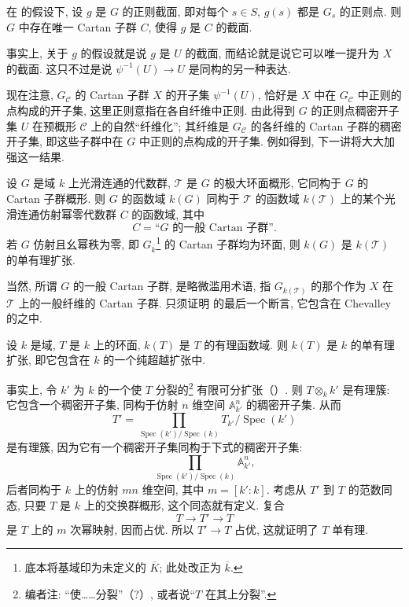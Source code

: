 \begin{corollary}
在  的假设下, 设 \(g\) 是 \(G\) 的正则截面, 即对每个 \(s\in S\), \(g(s)\) 都是 \(G_s\) 的正则点. 则 \(G\) 中存在唯一 Cartan 子群 \(C\), 使得 \(g\) 是 \(C\) 的截面.
\end{corollary}

事实上, 关于 \(g\) 的假设就是说 \(g\) 是 \(U\) 的截面, 而结论就是说它可以唯一提升为 \(X\) 的截面. 这只不过是说 \(\psi^{-1}(U)\to U\) 是同构的另一种表达.

现在注意, \(G_{\mathcal C}\) 的 Cartan 子群 \(X\) 的开子集 \(\psi^{-1}(U)\), 恰好是 \(X\) 中在 \(G_{\mathcal C}\) 中正则的点构成的开子集, 这里正则意指在各自纤维中正则. 由此得到 \(G\) 的正则点稠密开子集 \(U\) 在预概形 \(\mathcal C\) 上的自然“纤维化”; 其纤维是 \(G_{\mathcal C}\) 的各纤维的 Cartan 子群的稠密开子集, 即这些子群中在 \(G\) 中正则的点构成的开子集. 例如得到, 下一讲将大大加强这一结果.

\begin{corollary}
设 \(G\) 是域 \(k\) 上光滑连通的代数群, \(\mathcal T\) 是 \(G\) 的极大环面概形, 它同构于 \(G\) 的 Cartan 子群概形. 则 \(G\) 的函数域 \(k(G)\) 同构于 \(\mathcal T\) 的函数域 \(k(\mathcal T)\) 上的某个光滑连通仿射幂零代数群 \(C\) 的函数域, 其中
\[
  C=\text{“\(G\) 的一般 Cartan 子群”}.
\]
若 \(G\) 仿射且幺幂秩为零, 即 \(G_{\overline k}\)\footnote{底本将基域印为未定义的 \(\overline K\); 此处改正为 \(\overline k\).} 的 Cartan 子群均为环面, 则 \(k(G)\) 是 \(k(\mathcal T)\) 的单有理扩张.
\end{corollary}

当然, 所谓 \(G\) 的一般 Cartan 子群, 是略微滥用术语, 指 \(G_{k(\mathcal T)}\) 的那个作为 \(X\) 在 \(\mathcal T\) 上的一般纤维的 Cartan 子群. 只须证明  的最后一个断言, 它包含在 Chevalley 的之中.

\begin{lemma}
设 \(k\) 是域, \(T\) 是 \(k\) 上的环面, \(k(T)\) 是 \(T\) 的有理函数域. 则 \(k(T)\) 是 \(k\) 的单有理扩张, 即它包含在 \(k\) 的一个纯超越扩张中.
\end{lemma}

事实上, 令 \(k'\) 为 \(k\) 的一个使 \(T\) 分裂的\footnote{编者注: “使……分裂”（?）, 或者说“\(T\) 在其上分裂”.} 有限可分扩张（）. 则 \(T\otimes_k k'\) 是有理簇: 它包含一个稠密开子集, 同构于仿射 \(n\) 维空间 \(\mathbb A^n_{k'}\) 的稠密开子集. 从而
\[
  T'
  =
  \prod_{\operatorname{Spec}(k')/\operatorname{Spec}(k)}
  T_{k'}/\operatorname{Spec}(k')
\]
是有理簇, 因为它有一个稠密开子集同构于下式的稠密开子集:
\[
  \prod_{\operatorname{Spec}(k')/\operatorname{Spec}(k)}
  \mathbb A^n_{k'},
\]
后者同构于 \(k\) 上的仿射 \(mn\) 维空间, 其中 \(m=[k':k]\). 考虑从 \(T'\) 到 \(T\) 的范数同态, 只要 \(T\) 是 \(k\) 上的交换群概形, 这个同态就有定义. 复合
\[
  T\longrightarrow T'\longrightarrow T
\]
是 \(T\) 上的 \(m\) 次幂映射, 因而占优. 所以 \(T'\to T\) 占优, 这就证明了 \(T\) 单有理.

